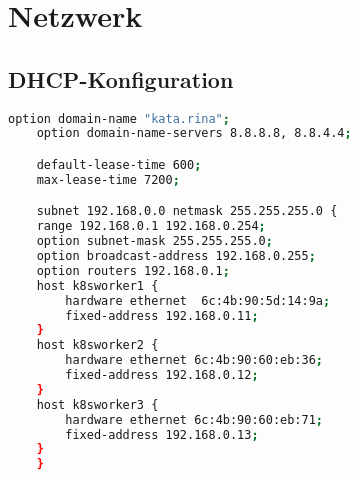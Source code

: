 \chapter{Netzwerk}

\section{DHCP-Konfiguration}

\begin{lstlisting}[language=bash]
    option domain-name "kata.rina";
    option domain-name-servers 8.8.8.8, 8.8.4.4;

    default-lease-time 600;
    max-lease-time 7200;

    subnet 192.168.0.0 netmask 255.255.255.0 {
    range 192.168.0.1 192.168.0.254;
    option subnet-mask 255.255.255.0;
    option broadcast-address 192.168.0.255;
    option routers 192.168.0.1;
    host k8sworker1 {
        hardware ethernet  6c:4b:90:5d:14:9a;
        fixed-address 192.168.0.11;
    }
    host k8sworker2 {
        hardware ethernet 6c:4b:90:60:eb:36; 
        fixed-address 192.168.0.12;
    }
    host k8sworker3 {
        hardware ethernet 6c:4b:90:60:eb:71;
        fixed-address 192.168.0.13;
    }
    }
\end{lstlisting}